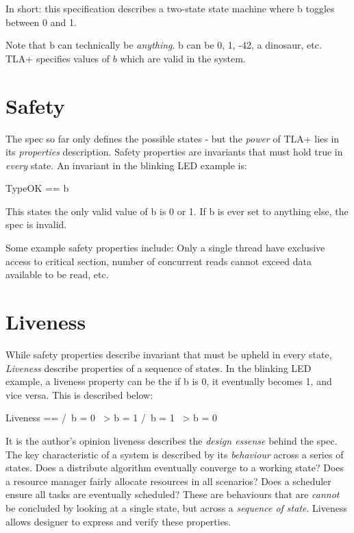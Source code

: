 In short: this specification describes a two-state state machine where b toggles
between 0 and 1.\newline

Note that b can technically be \textit{anything}. b can be 0, 1, -42, a
dinosaur, etc. TLA+ specifies values of $b$ which are valid in the system.

\section{Safety}

The spec so far only defines the possible states - but the \textit{power} of
TLA+ lies in its \textit{properties} description. Safety properties are
invariants that must hold true in \textit{every} state. An invariant in the
blinking LED example is: 
\begin{tla}
    TypeOK == b 
\end{tla}
\begin{tlatex}
%
\end{tlatex}

This states the only valid value of b is 0 or 1. If b is ever set to anything
else, the spec is invalid.\newline

Some example safety properties include: Only a single thread have exclusive
access to critical section, number of concurrent reads cannot exceed data
available to be read, etc. 

\section{Liveness}

While safety properties describe invariant that must be upheld in every state,
\textit{Liveness} describe properties of a sequence of states. In the blinking
LED example, a liveness property can be the if b is 0, it eventually becomes 1,
and vice versa. This is described below:
\begin{tla}
    Liveness == 
        /\ b = 0 ~> b = 1
        /\ b = 1 ~> b = 0
\end{tla}
\begin{tlatex}
%
%
%
\end{tlatex}

It is the author's opinion liveness describes the \textit{design essense} behind
the spec. The key characteristic of a system is described by its
\textit{behaviour} across a series of states. Does a distribute algorithm
eventually converge to a working state? Does a resource manager fairly allocate
resources in all scenarios? Does a scheduler ensure all tasks are eventually
scheduled? These are behaviours that are \textit{cannot} be concluded by looking
at a single state, but across a \textit{sequence of state}. Liveness allows 
designer to express and verify these properties.

